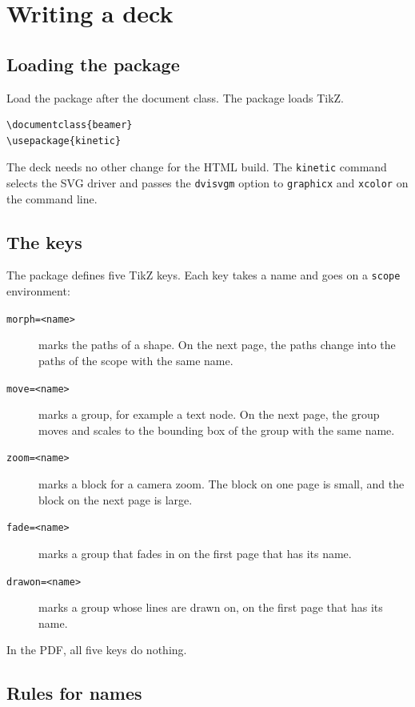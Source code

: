\documentclass[11pt]{article}
\newcommand{\cmd}[1]{\texttt{#1}}
\begin{document}
\section{Writing a deck}

\subsection{Loading the package}

Load the package after the document class. The package loads TikZ.
\begin{lstlisting}
\documentclass{beamer}
\usepackage{kinetic}
\end{lstlisting}
The deck needs no other change for the HTML build. The \cmd{kinetic} command
selects the SVG driver and passes the \cmd{dvisvgm} option to \cmd{graphicx} and
\cmd{xcolor} on the command line.

\subsection{The keys}

The package defines five TikZ keys. Each key takes a name and goes on a
\cmd{scope} environment:

\begin{description}
	\item[\cmd{morph=<name>}] marks the paths of a shape. On the next page, the
	      paths change into the paths of the scope with the same name.
	\item[\cmd{move=<name>}] marks a group, for example a text node. On the next
	      page, the group moves and scales to the bounding box of the group with the
	      same name.
	\item[\cmd{zoom=<name>}] marks a block for a camera zoom. The block on one
	      page is small, and the block on the next page is large.
	\item[\cmd{fade=<name>}] marks a group that fades in on the first page that has
	      its name.
	\item[\cmd{drawon=<name>}] marks a group whose lines are drawn on, on the first
	      page that has its name.
\end{description}

In the PDF, all five keys do nothing.

\subsection{Rules for names}
\end{document}
